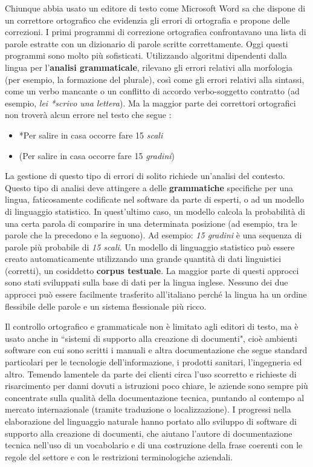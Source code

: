 \begin{multicols}{2}
Chiunque abbia usato un editore di testo come Microsoft Word sa che dispone di un correttore ortografico che evidenzia gli errori di ortografia e propone delle correzioni. I primi programmi di correzione ortografica confrontavano una lista di parole estratte con un dizionario di parole scritte correttamente. Oggi questi programmi sono molto pi\`{u} sofisticati. Utilizzando algoritmi dipendenti dalla lingua per l'\textbf{analisi grammaticale}, rilevano gli errori relativi alla morfologia (per esempio, la formazione del plurale), cos\`{i} come gli errori relativi alla sintassi, come un verbo mancante o un conflitto di accordo verbo-soggetto contratto (ad esempio, \emph{lei *scrivo una lettera}). Ma la maggior parte dei correttori ortografici non trover\`{a} alcun errore nel testo che segue \cite{zar1}:

\begin{itemize}
\item *Per salire in casa occorre fare 15 \emph{scali}
\item (Per salire in casa occorre fare 15 \emph{gradini})
\end{itemize}

La gestione di questo tipo di errori di solito richiede un'analisi del contesto.
Questo tipo di analisi deve attingere a delle \textbf{grammatiche} specifiche per una lingua, faticosamente codificate nel software da parte di esperti, o ad un modello di linguaggio statistico. In quest'ultimo caso, un modello calcola la probabilit\`{a} di una certa parola di comparire in una determinata posizione (ad esempio, tra le parole che la precedono e la seguono). Ad esempio: \emph{15 gradini} \`{e} una sequenza di parole pi\`{u} probabile di \emph{15 scali}. Un modello di linguaggio statistico pu\`{o} essere creato automaticamente utilizzando una grande quantit\`{a} di dati linguistici (corretti), un cosiddetto \textbf{corpus testuale}. La maggior parte di questi approcci sono stati sviluppati sulla base di dati per la lingua inglese. Nessuno dei due approcci pu\`{o} essere facilmente trasferito all'italiano perch\'{e} la lingua ha un ordine flessibile delle parole e un sistema flessionale pi\`{u} ricco.

Il controllo ortografico e grammaticale non \`{e} limitato agli editori di testo, ma \`{e} usato anche in “sistemi di supporto alla creazione di documenti", cio\`{e} ambienti software con cui sono scritti i manuali e altra documentazione che segue standard particolari per le tecnologie dell'informazione, i prodotti sanitari, l'ingegneria ed altro. Temendo lamentele da parte dei clienti circa l'uso scorretto e richieste di risarcimento per danni dovuti a istruzioni poco chiare, le aziende sono sempre pi\`{u} concentrate sulla qualit\`{a} della documentazione tecnica, puntando al contempo al mercato internazionale (tramite traduzione o localizzazione). I progressi nella elaborazione del linguaggio naturale hanno portato allo sviluppo di software di supporto alla creazione di documenti, che aiutano l'autore di documentazione tecnica nell'uso di un vocabolario e di una costruzione della frase coerenti con le regole del settore e con le restrizioni terminologiche aziendali.


\end{multicols}
